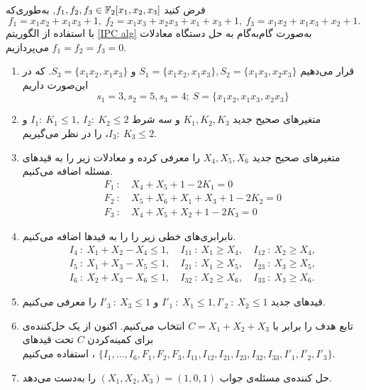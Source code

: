 \begin{example}
فرض کنید 
$f_{1},f_{2},f_{3}\in \mathbb{F}_{2}[x_{1},x_{2},x_{3}]$,
به‌طوری‌که 
$$f_{1} = x_{1}x_{2} + x_{1}x_{3} + 1, \  f_{2} = x_{1}x_{3} + x_{2}x_{3} + x_{1} + x_{3} + 1, \  f_{3} = x_{1}x_{2} + x_{1}x_{3} + x_{2} + 1.$$
با استفاده از الگوریتم 
\ref{IPC alg}
به‌صورت گام‌به‌گام به حل دستگاه معادلات 
$f_{1} = f_{2} = f_{3} = 0$
می‌پردازیم.

\begin{enumerate}
\item 
قرار می‌دهیم 
$S_{1} = \{x_{1}x_{2}, x_{1}x_{3}\}, S_{2} = \{x_{1}x_{3}, x_{2}x_{3}\}$
و 
$S_{3} = \{x_{1}x_{2}, x_{1}x_{3}\}$.
که در این‌صورت داریم 
\begin{equation*}
s_{1} = 3, s_{2} = 5, s_{3} = 4;  \ S = \{x_{1}x_{2}, x_{1}x_{3}, x_{2}x_{3}\}
\end{equation*}
\item
متغیرهای صحیح جدید 
$K_{1}, K_{2}, K_{3}$
و سه شرط 
$I_{1}: \ K_{1}\leq 1, \  I_{2}: \ K_{2}\leq 2$
و
$I_{3}: \ K_{3}\leq 2$،
 را در نظر می‌گیریم. 
 \item
متغیرهای صحیح جدید 
$X_{4}, X_{5}, X_{6}$
را  معرفی کرده  و معادلات زیر را به قیدهای مسئله اضافه می‌کنیم.
\begin{align*}
F_{1} \ :& \ X_{4} + X_{5} + 1 - 2K_{1} = 0\\
F_{2} \ :& \ X_{5} + X_{6} + X_{1} + X_{3} + 1 - 2K_{2} = 0\\
F_{3} \ :& \ X_{4} + X_{5} + X_{2} + 1 - 2K_{3} = 0
\end{align*}
\item 
نابرابری‌های  خطی زیر را را به قیدها اضافه می‌کنیم.
\begin{equation*}
\begin{array}{ccc}
I_{4} \ : \ X_{1} + X_{2} - X_{4} \leq 1, \ &I_{11} \ : \ X_{1} \geq X_{4}, \ &I_{12} \ : \ X_{2}\geq X_{4},\\
I_{5} \ : \ X_{1} + X_{3} -X_{5} \leq 1, \ &I_{21} \ : \ X_{1}\geq X_{5}, \ &I_{23} \ : \ X_{3}\geq X_{5},\\
I_{6} \ : \ X_{2} + X_{3} - X_{6} \leq 1, \ &I_{32} \ : \ X_{2}\geq X_{6}, \ &I_{33} \ : \ X_{3}\geq X_{6}.
\end{array}
\end{equation*}
\item 
قید‌های جدید 
$I'_{1} \ : \ X_{1}\leq 1, I'_{2} \ : \ X_{2}\leq 1$
و
$I'_{3} \ : \ X_{3}\leq 1$
را معرفی می‌کنیم. 
\item 
تابع هدف را برابر با 
$C = X_{1} + X_{2} + X_{3}$
انتخاب می‌کنیم. اکنون از یک حل‌کننده‌ی 
برای کمینه‌کردن 
$C$
تحت قیدهای 
$\{I_{1},...,I_{6}, F_{1},F_{2},F_{3}, I_{11}, I_{12}, I_{21}, I_{23}, I_{32}, I_{33}, I'_{1}, I'_{2}, I'_{3}\}$
، استفاده می‌کنیم. 
\item 
حل کننده‌ی مسئله‌ی 
جواب 
$(X_{1}, X_{2}, X_{3}) = (1, 0, 1)$
را به‌دست می‌دهد.
\end{enumerate}
\end{example}

